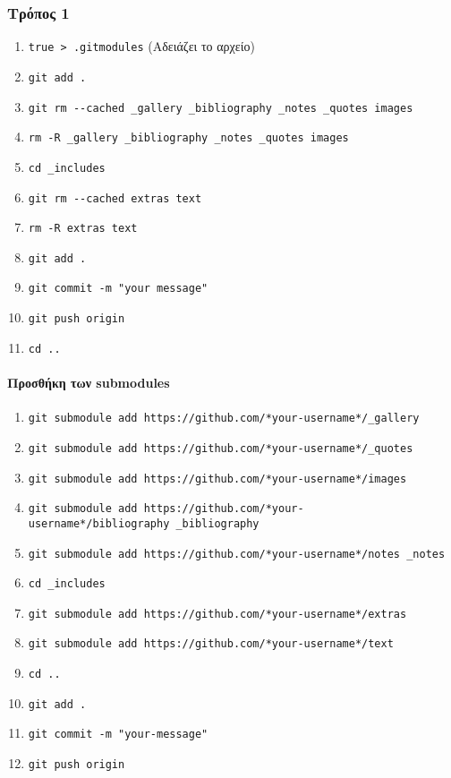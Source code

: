 \hypertarget{ux3c4ux3c1ux3ccux3c0ux3bfux3c2-1}{%
\subsubsection{Τρόπος 1}\label{ux3c4ux3c1ux3ccux3c0ux3bfux3c2-1}}

\begin{enumerate}
\def\labelenumi{\arabic{enumi}.}
\tightlist
\item
  \texttt{true\ \textgreater{}\ .gitmodules} (Αδειάζει το αρχείο)
\item
  \texttt{git\ add\ .}
\item
  \texttt{git\ rm\ -\/-cached\ \_gallery\ \_bibliography\ \_notes\ \_quotes\ images}
\item
  \texttt{rm\ -R\ \_gallery\ \_bibliography\ \_notes\ \_quotes\ images}
\item
  \texttt{cd\ \_includes}
\item
  \texttt{git\ rm\ -\/-cached\ extras\ text}
\item
  \texttt{rm\ -R\ extras\ text}
\item
  \texttt{git\ add\ .}
\item
  \texttt{git\ commit\ -m\ "your\ message"}
\item
  \texttt{git\ push\ origin}
\item
  \texttt{cd\ ..}
\end{enumerate}

\hypertarget{ux3c0ux3c1ux3bfux3c3ux3b8ux3aeux3baux3b7-ux3c4ux3c9ux3bd-submodules}{%
\paragraph{Προσθήκη των
submodules}\label{ux3c0ux3c1ux3bfux3c3ux3b8ux3aeux3baux3b7-ux3c4ux3c9ux3bd-submodules}}

\begin{enumerate}
\def\labelenumi{\arabic{enumi}.}
\tightlist
\item
  \texttt{git\ submodule\ add\ https://github.com/*your-username*/\_gallery}
\item
  \texttt{git\ submodule\ add\ https://github.com/*your-username*/\_quotes}
\item
  \texttt{git\ submodule\ add\ https://github.com/*your-username*/images}
\item
  \texttt{git\ submodule\ add\ https://github.com/*your-username*/bibliography\ \_bibliography}
\item
  \texttt{git\ submodule\ add\ https://github.com/*your-username*/notes\ \_notes}
\item
  \texttt{cd\ \_includes}
\item
  \texttt{git\ submodule\ add\ https://github.com/*your-username*/extras}
\item
  \texttt{git\ submodule\ add\ https://github.com/*your-username*/text}
\item
  \texttt{cd\ ..}
\item
  \texttt{git\ add\ .}
\item
  \texttt{git\ commit\ -m\ "your-message"}
\item
  \texttt{git\ push\ origin}
\end{enumerate}

